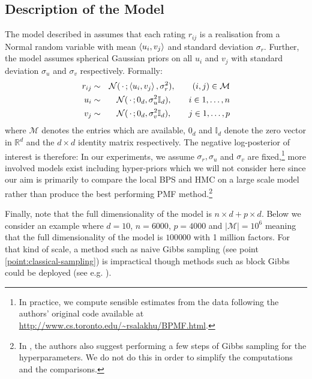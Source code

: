 \subsection{Description of the  Model}

The model described in \citet{mnih08} assumes that each rating $r_{ij}$ is a realisation from a Normal random variable with mean $\left\langle u_{i}, v_{j} \right\rangle$ and standard deviation $\sigma_{r}$. 
Further, the model assumes spherical Gaussian priors on all $u_{i}$ and $v_{j}$ with standard deviation $\sigma_{u}$ and $\sigma_{v}$ respectively. Formally:
%
\begin{eqnarray}
	r_{ij} &\sim& \mathcal N(\,\cdot\, ; \left\langle u_{i}, v_{j} \right\rangle, \sigma_{r}^{2}), \qquad (i,j)\in\mathcal M\nonumber\\
	u_{i} &\sim& \mathcal N(\,\cdot\, ; 0_{d}, \sigma_{u}^{2}\mathbb I_{d}), \qquad i\in 1,\dots,n \label{eq:pmf-model}\\
	v_{j} &\sim& \mathcal N(\,\cdot\, ; 0_{d}, \sigma_{v}^{2}\mathbb I_{d}), \qquad j\in 1,\dots,p\nonumber
\end{eqnarray}
%
where $\mathcal M$ denotes the entries which are available, $0_{d}$ and $\mathbb I_{d}$ denote the zero vector in $\mathbb R^{d}$ and the $d\times d$ identity matrix respectively. 
The negative log-posterior of interest is therefore:
%
%
In our experiments, we assume $\sigma_{r}, \sigma_{u}$ and $\sigma_{v}$ are fixed,\footnote{In practice, we compute sensible estimates from the data following the authors' original code available at \url{http://www.cs.toronto.edu/~rsalakhu/BPMF.html}.} more involved models exist including hyper-priors which we will not consider here since our aim is primarily to compare the local BPS and HMC on a large scale model rather than produce the best performing PMF method.\footnote{In \citet{mnih08}, the authors also suggest performing a few steps of Gibbs sampling for the hyperparameters. We do not do this in order to simplify the computations and the comparisons.}

Finally, note that the full dimensionality of the model is $n\times d + p\times d$. Below we consider an example where $d=10$, $n=6000$, $p=4000$ and $|\mathcal M|=10^{6}$ meaning that the full dimensionality of the model is $100 000$ with 1 million factors. For that kind of scale, a method such as naive Gibbs sampling (see point \ref{point:classical-sampling}) is impractical though methods such as block Gibbs could be deployed (see e.g. \citet[section 2.5]{geyer05}). 


